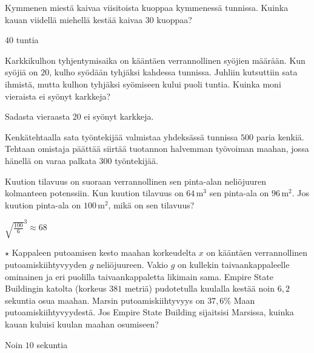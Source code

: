 \begin{tehtavasivu}
\begin{tehtava}
	Kymmenen miestä kaivaa viisitoista kuoppaa kymmenessä tunnissa. Kuinka kauan viidellä miehellä kestää kaivaa $30$ kuoppaa?	
	\begin{vastaus}
		$40$ tuntia
	\end{vastaus}
\end{tehtava}


\begin{tehtava}
	Karkkikulhon tyhjentymisaika on kääntäen verrannollinen syöjien määrään. Kun syöjiä on $20$, kulho syödään tyhjäksi kahdessa tunnissa. Juhliin kutsuttiin sata ihmistä, mutta kulhon tyhjäksi syömiseen kului puoli tuntia. Kuinka moni vieraista ei syönyt karkkeja?
	\begin{vastaus}
		Sadasta vieraasta 20 ei syönyt karkkeja.
	\end{vastaus}
\end{tehtava}

\begin{tehtava}
Kenkätehtaalla sata työntekijää valmistaa yhdeksässä tunnissa $500$ paria kenkiä. Tehtaan omistaja päättää siirtää tuotannon halvemman työvoiman maahan, jossa hänellä on varaa palkata $300$ työntekijää. 

\begin{vastaus}
\end{vastaus}
\end{tehtava}

\begin{tehtava}
	Kuution tilavuus on suoraan verrannollinen sen pinta-alan neliöjuuren kolmanteen potenssiin. Kun kuution tilavuus on $64$\,m$^3$ sen pinta-ala on $96$\,m$^2$. Jos kuution pinta-ala on $100$\,m$^2$, mikä on sen tilavuus?
	\begin{vastaus}
		${\sqrt{\frac{100}{6}}}^{3} \approx 68$
	\end{vastaus}
\end{tehtava}

\begin{tehtava} $\star$ Kappaleen putoamisen kesto maahan korkeudelta $x$ on kääntäen verrannollinen putoamiskiihtyvyyden $g$ neliöjuureen. Vakio $g$ on kullekin taivaankappaleelle ominainen ja eri puolilla taivaankappaletta likimain sama. Empire State Buildingin katolta (korkeus $381$ metriä) pudotetulla kuulalla kestää noin $6,2$ sekuntia osua maahan. Marsin putoamiskiihtyvyys on $37,6\%$ Maan putoamiskiihtyvyydestä.  Jos Empire State Building sijaitsisi Marsissa, kuinka kauan kuluisi kuulan maahan osumiseen?
    \begin{vastaus}
        Noin $10$ sekuntia
    \end{vastaus}
\end{tehtava}

\end{tehtavasivu}
